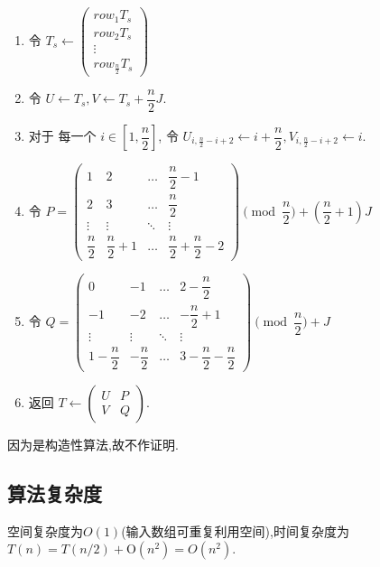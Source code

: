 \documentclass[UTF8]{ctexart}
\newcommand{\gro}{\mathrm{O}}
\begin{document}
\begin{enumerate}[]
\begin{enumerate}[1]
\begin{enumerate}[1]
\begin{enumerate}[1]
                \item 令 $T_s\leftarrow \begin{pmatrix}
                    row _1 T_s\\
                    row _2 T_s\\
                    \vdots\\
                    row _{\frac{n}{2}} T_s
                \end{pmatrix}$
                \item 令 $U \leftarrow T_s, V\leftarrow T_s + \dfrac{n}{2}J$.
                \item 对于 每一个 $i \in [1,\dfrac{n}{2}]$,
                令 $U_{i,\frac{n}{2}-i + 2} \leftarrow i + \dfrac{n}{2}, V_{i,\frac{n}{2}-i + 2} \leftarrow i$.
                \item 令 $P = \begin{pmatrix}
                    1 & 2 & \dots &\dfrac{n}{2} - 1\\
                    2 & 3 & \dots &\dfrac{n}{2}\\
                    \vdots&\vdots&\ddots&\vdots\\
                    \dfrac{n}{2} & \dfrac{n}{2} + 1 & \dots &\dfrac{n}{2} +\dfrac{n}{2} - 2
                \end{pmatrix}\pmod {\dfrac{n}{2}} + (\dfrac{n}{2} + 1) J$
                \item 令 $Q = \begin{pmatrix}
                    0 & -1 & \dots & 2 - \dfrac{n}{2}\\
                    -1 & -2 & \dots & -\dfrac{n}{2} + 1\\
                    \vdots&\vdots&\ddots&\vdots\\
                    1-\dfrac{n}{2} & -\dfrac{n}{2} & \dots &3-\dfrac{n}{2} -\dfrac{n}{2}
                \end{pmatrix}\pmod {\dfrac{n}{2}} + J$
                \item 返回 $T  \leftarrow\begin{pmatrix}
                    U & P\\
                    V & Q
                \end{pmatrix}$.
            \end{enumerate}
        \end{enumerate}
    \end{enumerate}
\end{enumerate}
因为是构造性算法,故不作证明.
\subsection{算法复杂度}
空间复杂度为$O(1)$(输入数组可重复利用空间),时间复杂度为$T(n) = T(n/2) + \gro(n^2)=O(n^2)$.
\end{document}
